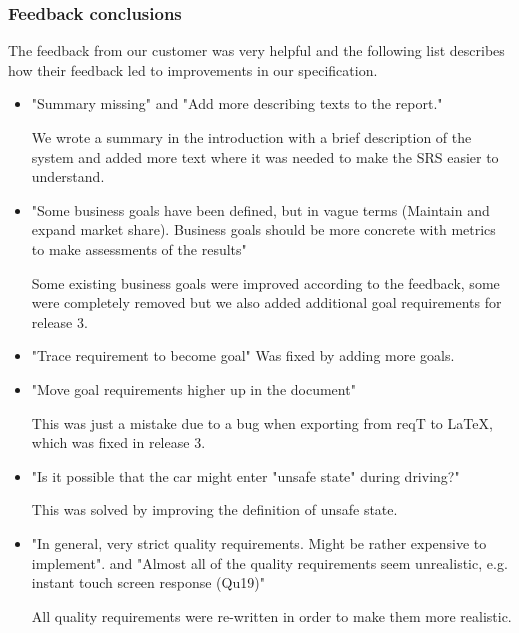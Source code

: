 \documentclass[10pt]{article}
\begin{document}
\subsubsection{Feedback conclusions}
The feedback from our customer was very helpful and the following list describes how their feedback led to improvements in our specification.
\begin{itemize}
\item "Summary missing" and "Add more describing texts to the report." 

We wrote a summary in the introduction with a brief description of the system and added more text where it was needed to make the SRS easier to understand.
\item "Some business goals have been defined, but in vague terms (Maintain and expand market share). Business goals should be more concrete with metrics to make assessments of the results"

Some existing business goals were improved according to the feedback, some were completely removed but we also added additional goal requirements for release 3.
\item "Trace requirement to become goal" Was fixed by adding more goals.
\item "Move goal requirements higher up in the document" 

This was just a mistake due to a bug when exporting from reqT to LaTeX, which was fixed in release 3.
\item "Is it possible that the car might enter "unsafe state" during driving?" 

This was solved by improving the definition of unsafe state.
\item "In general, very strict quality requirements. Might be rather expensive to implement". and "Almost all of the quality requirements seem unrealistic, e.g. instant touch screen response (Qu19)"

All quality requirements were re-written in order to make them more realistic.
\end{itemize}

\end{document}
